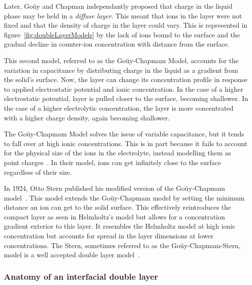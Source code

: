     Later, Goüy and Chapman independantly proposed that charge in the liquid phase may be held in a \emph{diffuse layer}.
    This meant that ions in the layer were not fixed and that the density of charge in the layer could vary.
    This is represented in figure~\ref{fig:doubleLayerModels} by the lack of ions bound to the surface and the gradual decline in counter-ion concentration with distance from the surface.

    This second model, referred to as the Goüy-Chapmam Model, accounts for the variation in capacitance by distributing charge in the liquid as a gradient from the solid's surface.
    Now, the layer can change its concentration profile in response to applied electrostatic potential and ionic concentration.
    In the case of a higher electrostatic potential, layer is pulled closer to the surface, becoming shallower.
    In the case of a higher electrolytic concentration, the layer is more concentrated with a higher charge density, again becoming shallower.

    The Goüy-Chapmam Model solves the issue of variable capacitance, but it tends to fall over at high ionic concentrations.
    This is in part because it fails to account for the physical size of the ions in the electrolyte, instead modelling them as point charges~\cite{Bard1980}.
    In their model, ions can get infinitely close to the surface regardless of their size.

    In 1924, Otto Stern published his modified version of the Goüy-Chapmam model~\cite{Stern1924}.
    This model extends the Goüy-Chapmam model by setting the minimum distance an ion can get to the solid surface.
    This effectively reintroduces the compact layer as seen in Helmholtz's model but allows for a concentration gradient exterior to this layer.
    It resembles the Helmholtz model at high ionic concentration but accounts for spread in the layer dimensions at lower concentrations.
    The Stern, sometimes referred to as the Goüy-Chapmam-Stern, model is a well accepted double layer model~\cite{Olthuis2005}.

  \subsubsection*{Anatomy of an interfacial double layer}

